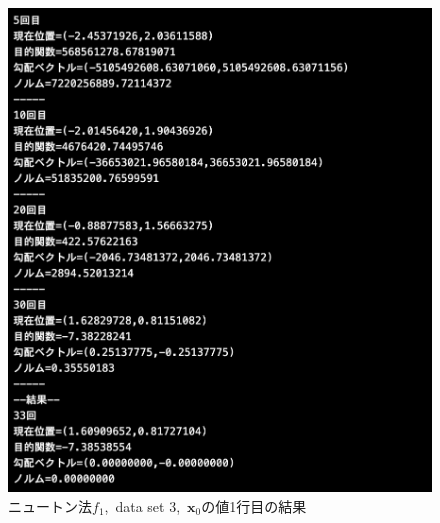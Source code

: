 \documentclass[12pt]{jarticle}
\begin{document}
\begin{figure}[h]
\begin{minipage}{0.5\hsize}
\begin{center}
            \includegraphics[scale=0.2]{kadai1_1n_out3_1_2.png}
        \end{center}
    \end{minipage}
    \caption{ニュートン法$f_1$,\ data set 3,\ $\boldsymbol{x}_0$の値1行目の結果}
\end{figure}
\end{document}

